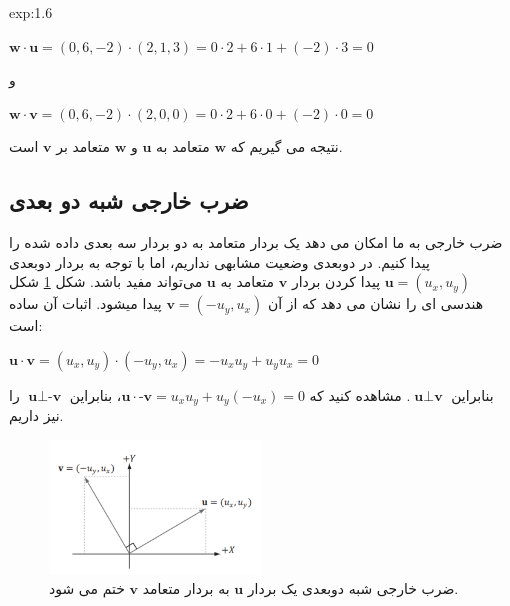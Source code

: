 {\begin{spacing}{1.5}
\begin{example}{exp:1.6}
            \begin{center}
                $\textbf{w}\cdot\textbf{u}=(0,6,-2)\cdot(2,1,3)=0\cdot 2+6\cdot 1+(-2)\cdot 3=0$

                و

                $\textbf{w}\cdot\textbf{v}=(0,6,-2)\cdot(2,0,0)=0\cdot 2+6\cdot 0+(-2)\cdot 0=0$
            \end{center}

            نتیجه می گیریم که $\textbf{w}$ متعامد به $\textbf{u}$ و $\textbf{w}$ متعامد بر $\textbf{v}$ است.
        \end{example}
    \end{spacing}
}

\subsection{\textbf{ضرب خارجی شبه دو بعدی}}
{
    \Large
    \begin{spacing}{1.5}
        ضرب خارجی به ما امکان می دهد یک بردار متعامد به دو بردار سه بعدی داده شده را پیدا کنیم.
        در دوبعدی وضعیت مشابهی نداریم،
        اما با توجه به بردار دوبعدی $\textbf{u}=(u_{x},u_{y})$ پیدا کردن بردار $\textbf{v}$ متعامد به $\textbf{u}$ می‌تواند مفید باشد.
        شکل \ref{fig:4.Session.1.1.14} شکل هندسی ای را نشان می دهد که از آن $\textbf{v}=(-u_{y},u_{x})$ پیدا میشود.
        اثبات آن ساده است:

        \begin{center}
            $\textbf{u}\cdot\textbf{v}=(u_{x},u_{y})\cdot(-u_{y},u_{x})=-u_{x}u_{y}+u_{y}u_{x}=0$
        \end{center}

        بنابراین $\textbf{u}\perp\textbf{v}$.
        مشاهده کنید که $\textbf{u}\cdot\textbf{-v}=u_{x}u_{y}+u_{y}(-u_{x})=0$، بنابراین $\textbf{u}\perp\textbf{-v}$ را نیز داریم.

        \begin{figure}[H]
            \centering
            \setlength{\belowcaptionskip}{-10pt}
            \includegraphics[width=0.5\textwidth]{Images/4/1/4.Session.1.1.14}
            \caption{ضرب خارجی شبه دوبعدی یک بردار $\textbf{u}$ به بردار متعامد $\textbf{v}$ ختم می شود.}
            \label{fig:4.Session.1.1.14}
        \end{figure}
    \end{spacing}
}

